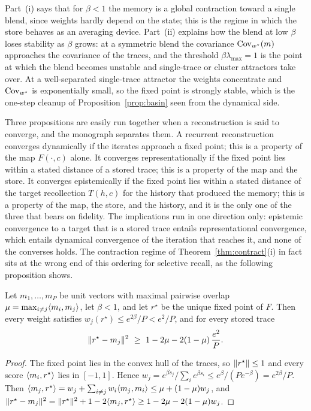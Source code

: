 Part~(i) says that for $\beta<1$ the memory is a global contraction toward a single blend, since weights hardly depend on the state; this is the regime in which the store behaves as an averaging device. Part~(ii) explains how the blend at low $\beta$ loses stability as $\beta$ grows: at a symmetric blend the covariance $\operatorname{Cov}_{w^\star}(m)$ approaches the covariance of the traces, and the threshold $\beta\lambda_{\max}=1$ is the point at which the blend becomes unstable and single-trace or cluster attractors take over. At a well-separated single-trace attractor the weights concentrate and $\operatorname{Cov}_{w^\star}$ is exponentially small, so the fixed point is strongly stable, which is the one-step cleanup of Proposition~\ref{prop:basin} seen from the dynamical side.

Three propositions are easily run together when a reconstruction is said to converge, and the monograph separates them. A recurrent reconstruction converges dynamically if the iterates approach a fixed point; this is a property of the map $F(\cdot,c)$ alone. It converges representationally if the fixed point lies within a stated distance of a stored trace; this is a property of the map and the store. It converges epistemically if the fixed point lies within a stated distance of the target recollection $T(h,c)$ for the history that produced the memory; this is a property of the map, the store, and the history, and it is the only one of the three that bears on fidelity. The implications run in one direction only: epistemic convergence to a target that is a stored trace entails representational convergence, which entails dynamical convergence of the iteration that reaches it, and none of the converses holds. The contraction regime of Theorem~\ref{thm:contract}(i) in fact sits at the wrong end of this ordering for selective recall, as the following proposition shows.

\begin{proposition}\label{prop:blend}
Let $m_1,\dots,m_P$ be unit vectors with maximal pairwise overlap $\mu=\max_{i\ne j}\langle m_i,m_j\rangle$, let $\beta<1$, and let $r^\star$ be the unique fixed point of $F$. Then every weight satisfies $w_j(r^\star)\le e^{2\beta}/P<e^2/P$, and for every stored trace
\begin{equation}
\norm{r^\star-m_j}^2\ \ge\ 1-2\mu-2(1-\mu)\,\frac{e^{2}}{P}.
\end{equation}
\end{proposition}

\begin{proof}
The fixed point lies in the convex hull of the traces, so $\lVert r^\star\rVert\le1$ and every score $\langle m_i,r^\star\rangle$ lies in $[-1,1]$. Hence $w_j=e^{\beta s_j}/\sum_ie^{\beta s_i}\le e^{\beta}/(Pe^{-\beta})=e^{2\beta}/P$. Then $\langle m_j,r^\star\rangle=w_j+\sum_{i\ne j}w_i\langle m_j,m_i\rangle\le\mu+(1-\mu)w_j$, and $\lVert r^\star-m_j\rVert^2=\lVert r^\star\rVert^2+1-2\langle m_j,r^\star\rangle\ge1-2\mu-2(1-\mu)w_j$.
\end{proof}

